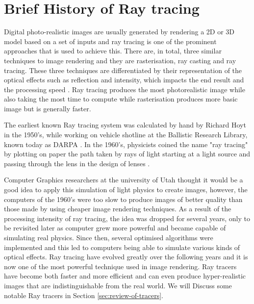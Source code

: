 \documentclass[a4paper]{report}
\begin{document}
	\section{Brief History of Ray tracing}
	
	\par Digital photo-realistic images are usually generated by rendering a 2D or 3D model based on a set of inputs and ray tracing is one of the prominent approaches that is used to achieve this. There are, in total, three similar techniques to image rendering and they are rasterisation, ray casting and ray tracing. These three techniques are differentiated by their representation of the optical effects such as reflection and intensity, which impacts the end result and the processing speed \cite{wald_interactive_2001}. Ray tracing produces the most photorealistic image while also taking the most time to compute while rasterisation produces more basic image but is generally faster.\newline
	
	\par The earliest known Ray tracing system was calculated by hand by Richard Hoyt in the 1950's, while working on vehicle shotline at the Ballistic Research Library, known today as DARPA \cite{klopcic_historical_1999}. In the 1960's, physicists coined the name "ray tracing" by plotting on paper the path taken by rays of light starting at a light source and passing through the lens in the design of lenses \cite{glassner_introduction_1989}.\newline
	
	\par Computer Graphics researchers at the university of Utah thought it would be a good idea to apply this simulation of light physics to create images, however, the computers of the 1960's were too slow to produce images of better quality than those made by using cheaper image rendering techniques. As a result of the processing intensity of ray tracing, the idea was dropped for several years, only to be revisited later as computer grew more powerful and became capable of simulating real physics\cite{weghorst_improved_1984}. Since then, several optimised algorithms were implemented and this led to computers being able to simulate various kinds of optical effects. Ray tracing have evolved greatly  over the following years and it is now one of the most powerful technique used in image rendering. Ray tracers have become both faster and more efficient and can even produce hyper-realistic images that are indistinguishable from the real world. We will Discuss some notable Ray tracers in Section \ref{sec:review-of-tracers}.\newline
	
\end{document}
